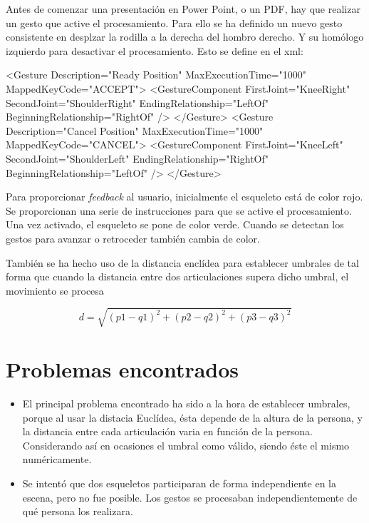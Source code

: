 \documentclass[	DIV=calc,%
							paper=a4,%
							fontsize=11pt]{scrartcl}	 					%
\begin{document}
Antes de comenzar una presentación en Power Point, o un PDF, hay que realizar un gesto que active el procesamiento. Para ello se ha definido un nuevo gesto consistente en desplzar la rodilla a la derecha del hombro derecho. Y su homólogo izquierdo para desactivar el procesamiento. Esto se define en el xml:
\begin{xmlcode}
	<Gesture Description="Ready Position" MaxExecutionTime="1000" MappedKeyCode="ACCEPT">
			<GestureComponent FirstJoint="KneeRight" SecondJoint="ShoulderRight" EndingRelationship="LeftOf" BeginningRelationship="RightOf" />
	</Gesture>
	<Gesture Description="Cancel Position" MaxExecutionTime="1000" MappedKeyCode="CANCEL">
			<GestureComponent FirstJoint="KneeLeft" SecondJoint="ShoulderLeft" EndingRelationship="RightOf" BeginningRelationship="LeftOf" />
	</Gesture>
\end{xmlcode}
Para proporcionar \textit{feedback} al usuario, inicialmente el esqueleto está de color rojo. Se proporcionan una serie de instrucciones para que se active el procesamiento. Una vez activado, el esqueleto se pone de color verde. Cuando se detectan los gestos para avanzar o retroceder también cambia de color.

También se ha hecho uso de la distancia enclídea para establecer umbrales de tal forma que cuando la distancia entre dos articulaciones supera dicho umbral, el movimiento se procesa

\[
	d = \sqrt{(p1-q1)^2 + (p2-q2)^2 + (p3-q3)^2}
\]

\section{Problemas encontrados}

\begin{itemize}
	\item El principal problema encontrado ha sido a la hora de establecer umbrales, porque al usar la distacia Euclídea, ésta depende de la altura de la persona, y la distancia entre cada articulación varia en función de la persona. Considerando así en ocasiones el umbral como válido, siendo éste el mismo numéricamente.
	\item Se intentó que dos esqueletos participaran de forma independiente en la escena, pero no fue posible. Los gestos se procesaban independientemente de qué persona los realizara.
\end{itemize}



{}

\end{document}
